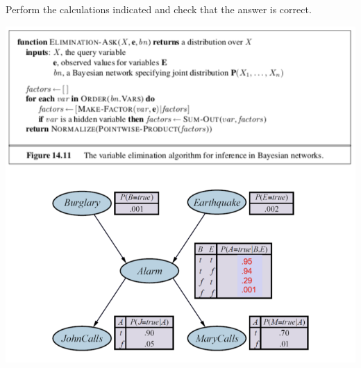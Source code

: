 \documentclass{article}
\begin{document}
\begin{enumerate}
Perform the calculations indicated and check that the answer is correct.

\begin{center}
    \includegraphics[scale=0.6]{472-PS10-Q4.png}
\end{center}


\end{enumerate}
\end{document}
